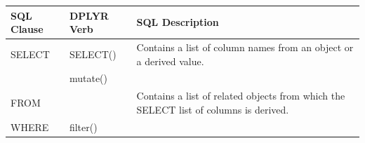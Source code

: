 \documentclass[]{book}
\theoremstyle{definition}
\theoremstyle{definition}
\theoremstyle{definition}
\theoremstyle{remark}
\begin{document}
\begin{longtable}[]{@{}lll@{}}
\toprule
\begin{minipage}[b]{0.24\columnwidth}\raggedright
SQL Clause\strut
\end{minipage} & \begin{minipage}[b]{0.24\columnwidth}\raggedright
DPLYR Verb\strut
\end{minipage} & \begin{minipage}[b]{0.42\columnwidth}\raggedright
SQL Description\strut
\end{minipage}\tabularnewline
\midrule
\endhead
\begin{minipage}[t]{0.24\columnwidth}\raggedright
SELECT\strut
\end{minipage} & \begin{minipage}[t]{0.24\columnwidth}\raggedright
SELECT()\strut
\end{minipage} & \begin{minipage}[t]{0.42\columnwidth}\raggedright
Contains a list of column names from an object or a derived value.\strut
\end{minipage}\tabularnewline
\begin{minipage}[t]{0.24\columnwidth}\raggedright
\strut
\end{minipage} & \begin{minipage}[t]{0.24\columnwidth}\raggedright
mutate()\strut
\end{minipage} & \begin{minipage}[t]{0.42\columnwidth}\raggedright
\strut
\end{minipage}\tabularnewline
\begin{minipage}[t]{0.24\columnwidth}\raggedright
FROM\strut
\end{minipage} & \begin{minipage}[t]{0.24\columnwidth}\raggedright
\strut
\end{minipage} & \begin{minipage}[t]{0.42\columnwidth}\raggedright
Contains a list of related objects from which the SELECT list of columns
is derived.\strut
\end{minipage}\tabularnewline
\begin{minipage}[t]{0.24\columnwidth}\raggedright
WHERE\strut
\end{minipage} & \begin{minipage}[t]{0.24\columnwidth}\raggedright
filter()\strut
\end{minipage} & \begin{minipage}[t]{0.42\columnwidth}\raggedright

\end{minipage}
\end{longtable}
\end{document}
